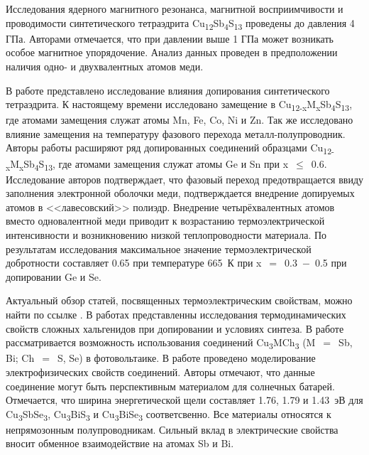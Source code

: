 Исследования ядерного магнитного резонанса, магнитной восприимчивости и проводимости синтетического тетраэдрита Cu\textsubscript{12}Sb\textsubscript{4}S\textsubscript{13} проведены\cite{Kitagawa2015} до давления 4 ГПа. Авторами отмечается, что при давлении выше 1 ГПа может возникать особое магнитное упорядочение. Анализ данных проведен в предположении наличия одно- и двухвалентных атомов меди.


В работе \cite{Kosaka2017} представлено исследование влияния допирования синтетического тетраэдрита. К настоящему времени исследовано замещение в Cu\textsubscript{12-x}M\textsubscript{x}Sb\textsubscript{4}S\textsubscript{13}, где атомами замещения служат атомы Mn, Fe, Co, Ni и Zn. Так же исследовано влияние замещения на температуру фазового перехода металл-полупроводник. Авторы работы расширяют ряд допированных соединений образцами Cu\textsubscript{12-x}M\textsubscript{x}Sb\textsubscript{4}S\textsubscript{13}, где атомами замещения служат атомы Ge и Sn при x~$\leq $~0.6. Исследование авторов подтверждает, что фазовый переход предотвращается ввиду заполнения электронной оболочки меди, подтверждается внедрение допируемых атомов в <<лавесовский>> полиэдр. Внедрение четырёхвалентных атомов вместо одновалентной меди приводит к возрастанию термоэлектрической интенсивности и возникновению низкой теплопроводности материала. По результатам исследования максимальное значение термоэлектрической добротности составляет 0.65 при температуре 665~К при x~$=$~0.3~$-$~0.5 при допировании Ge и Se.

Актуальный обзор статей, посвященных термоэлектрическим свойствам,  можно найти по ссылке \cite{Powella}. В работах \cite{ther_10.1007/s11664-016-4893-7,ther_10.1016/j.intermet.2016.08.003,ther_10.1016/j.jallcom.2017.01.187,ther_10.1039/C7RA02564E,ther_10.1039/C7TC00762K,ther_AENM:AENM201200650,ther_C5TC01636C,ther_C6DT00564K,ther_doi:10.1021/acs.chemmater.7b00891,ther_doi:10.1021/acs.inorgchem.7b02128,ther_doi:10.1021/acs.jpcc.7b02068,ther_doi.org/10.1016/j.jssc.2017.01.003,ther_GONCALVES2016209,ther_HARISH2016323,ther_JACE:JACE13838,ther_lu2014effect}  представленны исследования термодинамических свойств сложных хальгенидов при допировании и условиях синтеза.
В работе \cite{Kehoe_2013} рассматривается возможность использования соединений Cu\textsubscript{3}MCh\textsubscript{3} (M~$=$~Sb, Bi; Ch~$=$~S, Se) в фотовольтаике. В работе проведено моделирование электрофизических свойств соединений.
Авторы отмечают, что данные соединение могут быть перспективным материалом для солнечных батарей. Отмечается, что ширина энергетической щели составляет 1.76, 1.79 и 1.43~эВ для Cu\textsubscript{3}SbSe\textsubscript{3}, Cu\textsubscript{3}BiS\textsubscript{3} и Cu\textsubscript{3}BiSe\textsubscript{3} соответсвенно. Все материалы относятся к непрямозонным полупроводникам. Сильный вклад в электрические свойства вносит обменное взаимодействие на атомах Sb и Bi.
\newpage

